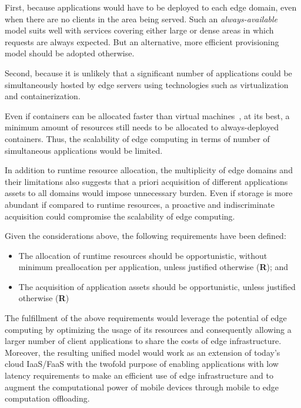 First, because applications would have to be deployed to each edge domain, even when there are no clients in the area being served. Such an \textit{always-available} model suits well with services covering either large or dense areas in which requests are always expected. But an alternative, more efficient provisioning model should be adopted otherwise.

Second, because it is unlikely that a significant number of applications could be simultaneously hosted by edge servers using technologies such as virtualization and containerization. 

Even if containers can be allocated faster than virtual machines~\cite{Quatrocchi2016discrete}, at its best, a minimum amount of resources still needs to be allocated to always-deployed containers. Thus, the scalability of edge computing in terms of number of simultaneous applications would be limited. 
	
In addition to runtime resource allocation, the multiplicity of edge domains and their limitations also suggests that a priori acquisition of different applications assets to all domains would impose unnecessary burden. Even if storage is more abundant if compared to runtime resources, a proactive and indiscriminate acquisition could compromise the scalability of edge computing.

\noindent Given the considerations above, 
the following requirements have been defined:

\begin{itemize}

	\item The allocation of runtime resources should be opportunistic, without minimum preallocation per application, unless justified otherwise (\textbf{R}); and
	
	\item The acquisition of application assets should be opportunistic, unless justified otherwise (\textbf{R})

\end{itemize} 

The fulfillment of the above requirements would leverage the potential of edge computing by optimizing the usage of its resources and consequently allowing a larger number of client applications to share the costs of edge infrastructure. Moreover, the resulting unified model would work as an extension of today's cloud IaaS/FaaS with the twofold purpose of enabling applications with low latency requirements to make an efficient use of edge infrastructure and to augment the computational power of mobile devices through mobile to edge computation offloading. 